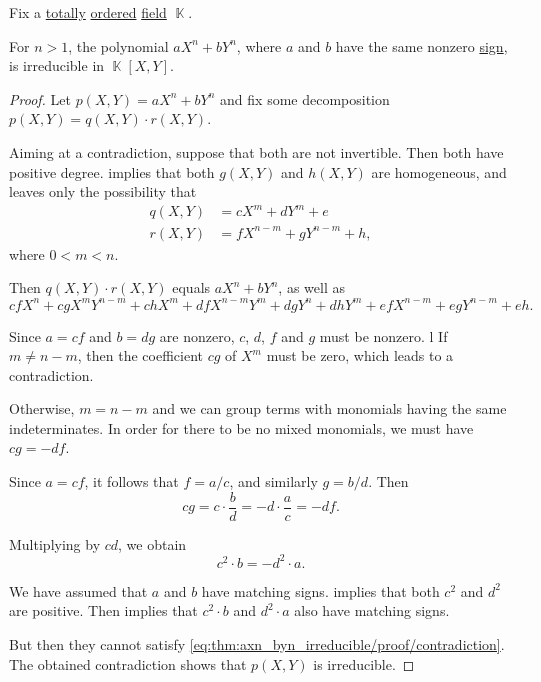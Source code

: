 \begin{proposition}\label{thm:axn_byn_irreducible}
  Fix a \hyperref[def:totally_ordered_set]{totally} \hyperref[def:ordered_semiring]{ordered} \hyperref[def:field]{field} \( \BbbK \).

  For \( n > 1 \), the polynomial \( a X^n + b Y^n \), where \( a \) and \( b \) have the same nonzero \hyperref[def:signum]{sign}, is irreducible in \( \BbbK[X, Y] \).
\end{proposition}
\begin{proof}
  Let \( p(X, Y) = a X^n + b Y^n \) and fix some decomposition \( p(X, Y) = q(X, Y) \cdot r(X, Y) \).

  Aiming at a contradiction, suppose that both are not invertible. Then both have positive degree.  implies that both \( g(X, Y) \) and \( h(X, Y) \) are homogeneous, and  leaves only the possibility that
  \begin{align*}
    q(X, Y) &= c X^m + d Y^m + e \\
    r(X, Y) &= f X^{n-m} + g Y^{n-m} + h,
  \end{align*}
  where \( 0 < m < n \).

  Then \( q(X, Y) \cdot r(X, Y) \) equals \( a X^n + b Y^n \), as well as
  \begin{equation*}
    c f X^n + c g X^m Y^{n-m} + c h X^m + d f X^{n-m} Y^m + d g Y^n + d h Y^m + e f X^{n-m} + e g Y^{n-m} + e h.
  \end{equation*}

  Since \( a = c f \) and \( b = d g \) are nonzero, \( c \), \( d \), \( f \) and \( g \) must be nonzero.
l
  If \( m \neq n - m \), then the coefficient \( c g \) of \( X^m \) must be zero, which leads to a contradiction.

  Otherwise, \( m = n - m \) and we can group terms with monomials having the same indeterminates. In order for there to be no mixed monomials, we must have \( c g = - d f \).

  Since \( a = c f \), it follows that \( f = a / c \), and similarly \( g = b / d \). Then
  \begin{equation*}
    c g = c \cdot \frac b d = - d \cdot \frac a c = - d f.
  \end{equation*}

  Multiplying by \( cd \), we obtain
  \begin{equation}\label{eq:thm:axn_byn_irreducible/proof/contradiction}
    c^2 \cdot b = - d^2 \cdot a.
  \end{equation}

  We have assumed that \( a \) and \( b \) have matching signs.  implies that both \( c^2 \) and \( d^2 \) are positive. Then  implies that \( c^2 \cdot b \) and \( d^2 \cdot a \) also have matching signs.

  But then they cannot satisfy \eqref{eq:thm:axn_byn_irreducible/proof/contradiction}. The obtained contradiction shows that \( p(X, Y) \) is irreducible.
\end{proof}

